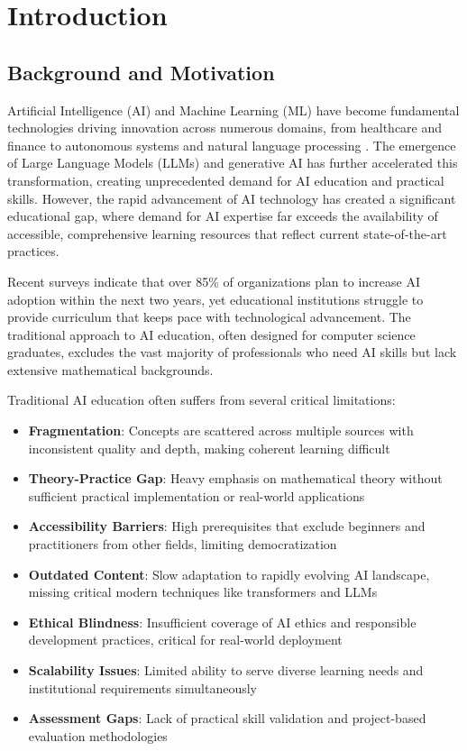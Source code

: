 \section{Introduction}
\label{sec:introduction}

\subsection{Background and Motivation}

Artificial Intelligence (AI) and Machine Learning (ML) have become fundamental technologies driving innovation across numerous domains, from healthcare and finance to autonomous systems and natural language processing \cite{russell2016artificial}. The emergence of Large Language Models (LLMs) and generative AI has further accelerated this transformation, creating unprecedented demand for AI education and practical skills. However, the rapid advancement of AI technology has created a significant educational gap, where demand for AI expertise far exceeds the availability of accessible, comprehensive learning resources that reflect current state-of-the-art practices.

Recent surveys indicate that over 85\% of organizations plan to increase AI adoption within the next two years, yet educational institutions struggle to provide curriculum that keeps pace with technological advancement. The traditional approach to AI education, often designed for computer science graduates, excludes the vast majority of professionals who need AI skills but lack extensive mathematical backgrounds.

Traditional AI education often suffers from several critical limitations:
\begin{itemize}
    \item \textbf{Fragmentation}: Concepts are scattered across multiple sources with inconsistent quality and depth, making coherent learning difficult
    \item \textbf{Theory-Practice Gap}: Heavy emphasis on mathematical theory without sufficient practical implementation or real-world applications
    \item \textbf{Accessibility Barriers}: High prerequisites that exclude beginners and practitioners from other fields, limiting democratization
    \item \textbf{Outdated Content}: Slow adaptation to rapidly evolving AI landscape, missing critical modern techniques like transformers and LLMs
    \item \textbf{Ethical Blindness}: Insufficient coverage of AI ethics and responsible development practices, critical for real-world deployment
    \item \textbf{Scalability Issues}: Limited ability to serve diverse learning needs and institutional requirements simultaneously
    \item \textbf{Assessment Gaps}: Lack of practical skill validation and project-based evaluation methodologies
\end{itemize}

